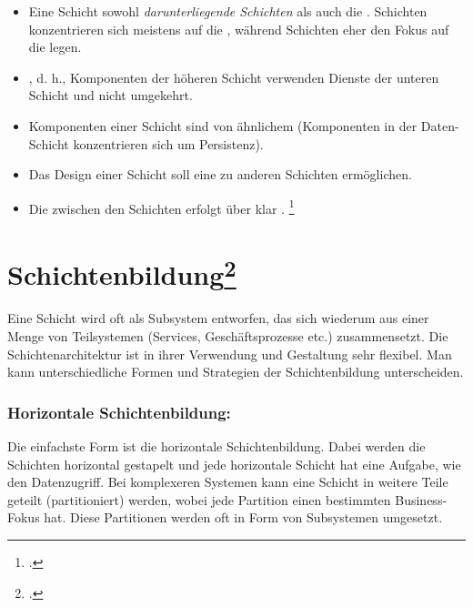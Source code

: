 \documentclass{bschlangaul-theorie}
\begin{document}
\begin{itemize}
\item Eine Schicht  sowohl \emph{darunterliegende
Schichten} als auch die . 
Schichten konzentrieren sich meistens auf die , während
 Schichten eher den Fokus auf die
 legen.

\item {}, d. h., Komponenten der höheren
Schicht verwenden Dienste der unteren Schicht und nicht umgekehrt.

\item Komponenten  einer Schicht sind von ähnlichem
 (\zB Komponenten in der Daten-Schicht
konzentrieren sich um Persistenz).

\item Das Design einer Schicht soll eine  zu
anderen Schichten ermöglichen.

\item Die  zwischen den Schichten erfolgt über klar
.
\footcite[Seite 211]{schatten}
\end{itemize}

%

\section{Schichtenbildung\footcite[Seite 11]{sosy:fs:4}}

Eine Schicht wird oft als Subsystem entworfen, das sich wiederum aus
einer Menge von Teilsystemen (\zB Services, Geschäftsprozesse etc.)
zusammensetzt. Die Schichtenarchitektur ist in ihrer Verwendung und
Gestaltung sehr flexibel. Man kann unterschiedliche Formen und
Strategien der Schichtenbildung unterscheiden.

\subsubsection{Horizontale Schichtenbildung:}

Die einfachste Form ist die horizontale Schichtenbildung. Dabei werden
die Schichten horizontal gestapelt und jede horizontale Schicht hat
eine Aufgabe, wie \zB den Datenzugriff. Bei komplexeren Systemen
kann eine Schicht in weitere Teile geteilt (partitioniert) werden,
wobei jede Partition einen bestimmten Business-Fokus hat. Diese
Partitionen werden oft in Form von Subsystemen umgesetzt.
\end{document}

